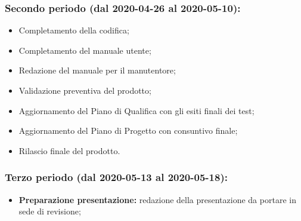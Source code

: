		\subsubsection{Secondo periodo (dal 2020-04-26 al 2020-05-10):}
			\begin{itemize}
				\item Completamento della codifica;
				\item Completamento del manuale utente;
				\item Redazione del manuale per il manutentore;
				\item Validazione preventiva del prodotto;
				\item Aggiornamento del Piano di Qualifica con gli esiti finali dei test;
				\item Aggiornamento del Piano di Progetto con consuntivo finale;
				\item Rilascio finale del prodotto.
			\end{itemize}

		\subsubsection{Terzo periodo (dal 2020-05-13 al 2020-05-18):}
			\begin{itemize}
				\item \textbf{Preparazione presentazione:} redazione della presentazione da portare in sede di revisione;
			\end{itemize}

